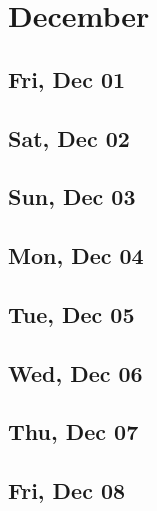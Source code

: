 \chapter{December}
	\section{Fri, Dec 01}
		
		
	\section{Sat, Dec 02}
		
		
	\section{Sun, Dec 03}
		
		
	\section{Mon, Dec 04}
		
		
	\section{Tue, Dec 05}
		
		
	\section{Wed, Dec 06}
		
		
	\section{Thu, Dec 07}
		
		
	\section{Fri, Dec 08}
		
		
